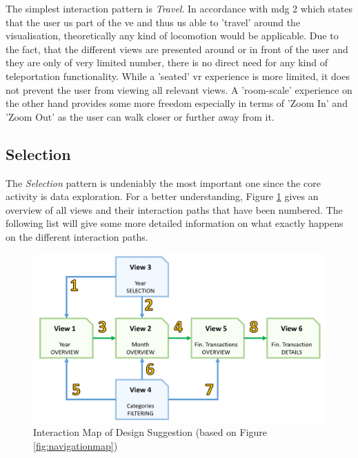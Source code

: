 The simplest interaction pattern is \textit{Travel}. In accordance with \gls{mdg} 2 which states that the user us part of the \gls{ve} and thus us able to 'travel' around the visualisation, theoretically any kind of locomotion would be applicable. Due to the fact, that the different views are presented around or in front of the user and they are only of very limited number, there is no direct need for any kind of teleportation functionality. While a 'seated' \gls{vr} experience is more limited, it does not prevent the user from viewing all relevant views. A 'room-scale' experience on the other hand provides some more freedom especially in terms of 'Zoom In' and 'Zoom Out' as the user can walk closer or further away from it.



\subsection{Selection}

The \textit{Selection} pattern is undeniably the most important one since the core activity is data exploration. For a better understanding, Figure \ref{fig:interactionmap} gives an overview of all views and their interaction paths that have been numbered. The following list will give some more detailed information on what exactly happens on the different interaction paths.
\begin{figure}[t]
	\begin{center}
		\includegraphics[width=14cm]{03_Figures/07_Suggestion/InteractionMap.png}
		\caption[Interaction Map of Design Suggestion]{Interaction Map of Design Suggestion (based on Figure \ref{fig:navigationmap})}
		\label{fig:interactionmap}
	\end{center}
\end{figure}

